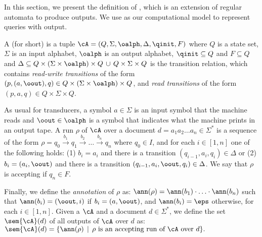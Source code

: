 
In this section, we present the definition of \rtname, which is an extension of regular automata to produce outputs. We use \rtnames as our computational model to represent queries with output. 
	
	A \emph{\rtname} (\rt for short) is a tuple $\cA = (Q, \Sigma, \oalph, \Delta, \qinit, F)$ where $Q$ is a state set, $\Sigma$ is an input alphabet, $\oalph$ is an output alphabet, $\qinit \subseteq Q$ and $F \subseteq Q$ and $\Delta \subseteq Q \times (\Sigma \times \oalph) \times Q \,\cup\, Q \times \Sigma \times Q $ is the transition relation, which contains {\em read-write transitions} of the form $(p, (a, \oout), q)\in Q\times(\Sigma\times\oalph)\times Q$, and {\em read transitions} of the form  $(p, a, q)\in Q\times\Sigma\times Q$.
	
	As usual for transducers, a symbol $a \in \Sigma$ is an input symbol that the machine reads and $\oout \in \oalph$ is a symbol that indicates what the machine prints in an output tape.
	A run $\rho$ of $\cA$ over a document $d = a_1a_2\ldots a_n \in\Sigma^*$ is a sequence of the form
	$
	\rho = q_0 \xrightarrow{b_1} q_1 \xrightarrow{b_2} \ldots \xrightarrow{b_n} q_{n}
	$
	where $q_0 \in I$, and for each $i\in [1,n]$ one of the following holds: (1) $b_i = a_i$ and there is a transition $(q_{i-1}, a_i, q_i)\in \Delta$ or (2) $b_i = (a_i, \oout)$ and there is a transition $(q_{i-1}, a_i, \oout, q_i)\in \Delta$. We say that $\rho$ is accepting if $q_n\in F$.
	
	Finally, we define the {\em annotation} of $\rho$ as:
	$
	\ann(\rho) =  \ann(b_1)\cdot \ldots \cdot \ann(b_n)
	$
	such that $\ann(b_i) = (\oout, i)$ if $b_i = (a, \oout)$, and $\ann(b_i) = \eps$ otherwise, for each $i\in[1, n]$.
	Given a \rtname $\cA$ and a document $d \in\Sigma^*$, we define the set $\sem{\cA}(d)$ of all outputs of $\cA$ over $d$ as:
	$
	\sem{\cA}(d) = \{ \ann(\rho) \, \mid \, \text{$\rho$ is an accepting run of $\cA$ over $d$}\}.
	$
	
